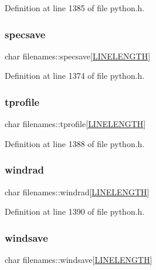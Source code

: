 Definition at line 1385 of file python.\+h.

\mbox{\label{structfilenames_a12010879e17a410582c95418e70fb8f4}} 
\subsubsection{\texorpdfstring{specsave}{specsave}}
{\footnotesize\ttfamily char filenames\+::specsave\mbox{[}\hyperlink{xlog_8c_a10e8c7b8458375c3dbfbb4010a2aba8c}{L\+I\+N\+E\+L\+E\+N\+G\+TH}\mbox{]}}



Definition at line 1374 of file python.\+h.

\mbox{\label{structfilenames_ab591635bb4619345b1367b36cdd2cce6}} 
\subsubsection{\texorpdfstring{tprofile}{tprofile}}
{\footnotesize\ttfamily char filenames\+::tprofile\mbox{[}\hyperlink{xlog_8c_a10e8c7b8458375c3dbfbb4010a2aba8c}{L\+I\+N\+E\+L\+E\+N\+G\+TH}\mbox{]}}



Definition at line 1388 of file python.\+h.

\mbox{\label{structfilenames_a647feff8c9ae68afbf7fda1112da79de}} 
\subsubsection{\texorpdfstring{windrad}{windrad}}
{\footnotesize\ttfamily char filenames\+::windrad\mbox{[}\hyperlink{xlog_8c_a10e8c7b8458375c3dbfbb4010a2aba8c}{L\+I\+N\+E\+L\+E\+N\+G\+TH}\mbox{]}}



Definition at line 1390 of file python.\+h.

\mbox{\label{structfilenames_a316c909bfa7dc0d7740d84f9d33d6418}} 
\subsubsection{\texorpdfstring{windsave}{windsave}}
{\footnotesize\ttfamily char filenames\+::windsave\mbox{[}\hyperlink{xlog_8c_a10e8c7b8458375c3dbfbb4010a2aba8c}{L\+I\+N\+E\+L\+E\+N\+G\+TH}\mbox{]}}



